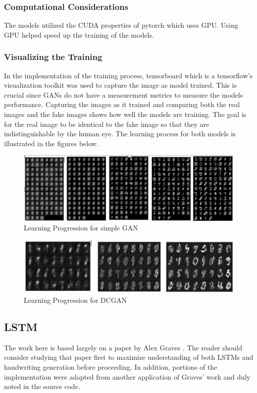 \documentclass{article}
\begin{document}
\subsubsection{Computational Considerations}
The models utilized the CUDA properties of pytorch which uses GPU. Using GPU helped speed up the training of the models.

\subsubsection{Visualizing the Training}
In the implementation of the training process, tensorboard which is a tensorflow's visualization toolkit was used to capture the image as model trained. This is crucial since GANs do not have a measurement metrics to measure the models performance. Capturing the images as it trained and comparing both the real images and the fake images shows how well the models are training. The goal is for the real image to be identical to the fake image so that they are indistinguishable by the human eye. The learning process for both models is illustrated in the figures below.

\begin{figure}[hbt!]
    \includegraphics[width=12cm]{graphics/simpleGan.png}
    \centering
    \caption{Learning Progression for simple GAN}
    \label{fig:Simple GAN}
\end{figure}
    

 \begin{figure}[hbt!]
    \includegraphics[width=12cm]{graphics/DCGAN.png}
    \centering
    \caption{Learning Progression for DCGAN}
    \label{fig:DCGAN}
\end{figure}   

    
\subsection{LSTM}
The work here is based largely on a paper by Alex Graves \cite{DBLP:journals/corr/Graves13}.  The reader should consider studying that paper first to maximize understanding of both LSTMs and handwriting generation before proceeding.  In addition, portions of the implementation were adapted from another application of Graves' work \cite{adeboissiere} and duly noted in the source code.
\end{document}
